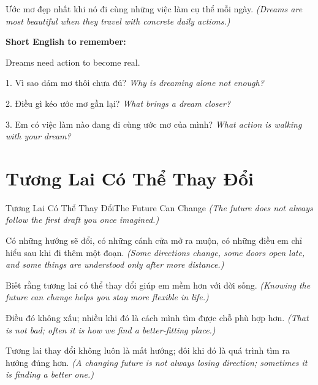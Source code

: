 \begin{baihoc}
Ước mơ đẹp nhất khi nó đi cùng những việc làm cụ thể mỗi ngày.
\textit{(Dreams are most beautiful when they travel with concrete daily actions.)}
\end{baihoc}

\begin{ghinhoanh}
\textbf{Short English to remember:}

Dreams need action to become real.

\end{ghinhoanh}

\begin{tuhocnhanh}
1. Vì sao dám mơ thôi chưa đủ? \textit{Why is dreaming alone not enough?}

2. Điều gì kéo ước mơ gần lại? \textit{What brings a dream closer?}

3. Em có việc làm nào đang đi cùng ước mơ của mình? \textit{What action is walking with your dream?}
\end{tuhocnhanh}
\ngancach

\section{Tương Lai Có Thể Thay Đổi}
\begin{truyen}{Tương Lai Có Thể Thay Đổi}{The Future Can Change}
\textit{(The future does not always follow the first draft you once imagined.)}

Có những hướng sẽ đổi, có những cánh cửa mở ra muộn, có những điều em chỉ hiểu sau khi đi thêm một đoạn.
\textit{(Some directions change, some doors open late, and some things are understood only after more distance.)}

Biết rằng tương lai có thể thay đổi giúp em mềm hơn với đời sống.
\textit{(Knowing the future can change helps you stay more flexible in life.)}

Điều đó không xấu; nhiều khi đó là cách mình tìm được chỗ phù hợp hơn.
\textit{(That is not bad; often it is how we find a better-fitting place.)}
\end{truyen}

\begin{baihoc}
Tương lai thay đổi không luôn là mất hướng; đôi khi đó là quá trình tìm ra hướng đúng hơn.
\textit{(A changing future is not always losing direction; sometimes it is finding a better one.)}
\end{baihoc}

